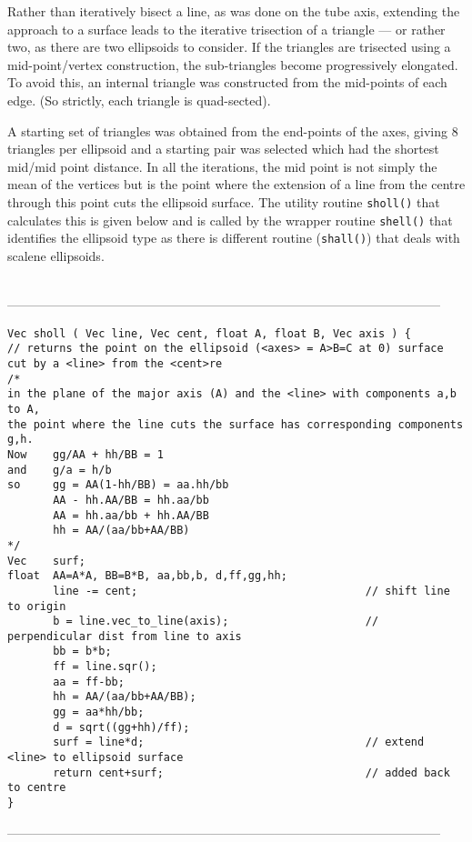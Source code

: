 {{{{{Rather than iteratively bisect a line, as was done on the tube axis, extending the approach
to a surface leads to the iterative trisection of a triangle --- or rather two, as there
are two ellipsoids to consider.   If the triangles are trisected using a mid-point/vertex
construction, the sub-triangles become progressively elongated.  To avoid this, an internal
triangle was constructed from the mid-points of each edge. (So strictly, each triangle is
quad-sected).

A starting set of triangles was obtained from the end-points 
of the axes, giving 8 triangles per ellipsoid and a starting pair was selected which had the
shortest mid/mid point distance.  In all the iterations, the mid point is not simply the mean
of the vertices but is the point where the extension of a line from the centre through this point
cuts the ellipsoid surface.  The utility routine {\tt sholl()} that calculates this is given
below and is called by the wrapper routine {\tt shell()} that identifies the ellipsoid type
as there is different routine ({\tt shall()}) that deals with scalene ellipsoids.
\begin{singlespace}
\ \\
------------------------------------------------------------------------------------------------------
\begin{tiny}
\begin{verbatim}
Vec sholl ( Vec line, Vec cent, float A, float B, Vec axis ) {
// returns the point on the ellipsoid (<axes> = A>B=C at 0) surface cut by a <line> from the <cent>re
/*
in the plane of the major axis (A) and the <line> with components a,b to A,
the point where the line cuts the surface has corresponding components g,h.
Now    gg/AA + hh/BB = 1
and    g/a = h/b
so     gg = AA(1-hh/BB) = aa.hh/bb
       AA - hh.AA/BB = hh.aa/bb
       AA = hh.aa/bb + hh.AA/BB
       hh = AA/(aa/bb+AA/BB)
*/
Vec    surf;
float  AA=A*A, BB=B*B, aa,bb,b, d,ff,gg,hh;
       line -= cent;                                   // shift line to origin
       b = line.vec_to_line(axis);                     // perpendicular dist from line to axis
       bb = b*b;
       ff = line.sqr();
       aa = ff-bb;
       hh = AA/(aa/bb+AA/BB);
       gg = aa*hh/bb;
       d = sqrt((gg+hh)/ff);
       surf = line*d;                                  // extend <line> to ellipsoid surface
       return cent+surf;                               // added back to centre
}
\end{verbatim}
\end{tiny}
------------------------------------------------------------------------------------------------------
\end{singlespace}

}}}}}
